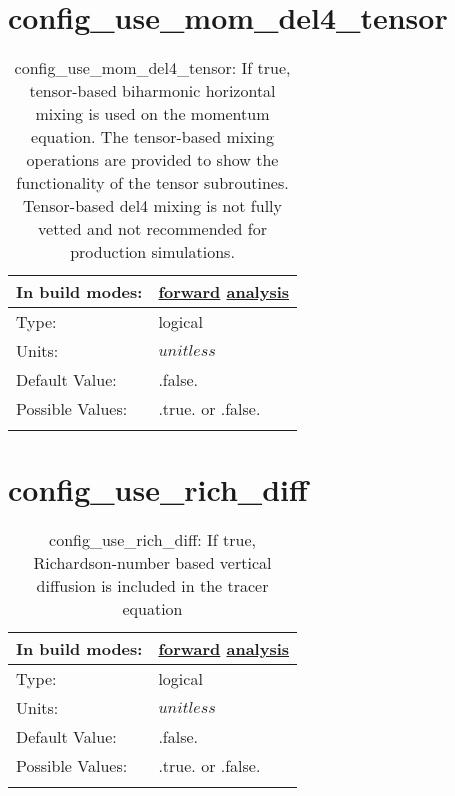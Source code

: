 \section[config\_use\_mom\_del4\_tensor]{config\_use\_mom\_del4\_tensor}
\label{sec:nm_sec_config_use_mom_del4_tensor}
\begin{center}
\begin{longtable}{| p{2.0in} || p{4.0in} |}
    \hline
    In build modes: & \hyperref[subsec:forward_nm_tab_hmix_del4_tensor]{forward} \hyperref[subsec:analysis_nm_tab_hmix_del4_tensor]{analysis} \\
    \hline
    Type: & logical \\
    \hline
    Units: & $unitless$ \\
    \hline
    Default Value: & .false. \\
    \hline
    Possible Values: & .true. or .false. \\
    \hline
    \caption{config\_use\_mom\_del4\_tensor: If true, tensor-based biharmonic horizontal mixing is used on the momentum equation. The tensor-based mixing operations are provided to show the functionality of the tensor subroutines. Tensor-based del4 mixing is not fully vetted and not recommended for production simulations.}
\end{longtable}
\end{center}
\section[config\_use\_rich\_diff]{config\_use\_rich\_diff}
\label{sec:nm_sec_config_use_rich_diff}
\begin{center}
\begin{longtable}{| p{2.0in} || p{4.0in} |}
    \hline
    In build modes: & \hyperref[subsec:forward_nm_tab_vmix_rich]{forward} \hyperref[subsec:analysis_nm_tab_vmix_rich]{analysis} \\
    \hline
    Type: & logical \\
    \hline
    Units: & $unitless$ \\
    \hline
    Default Value: & .false. \\
    \hline
    Possible Values: & .true. or .false. \\
    \hline
    \caption{config\_use\_rich\_diff: If true, Richardson-number based vertical diffusion is included in the tracer equation}
\end{longtable}
\end{center}
